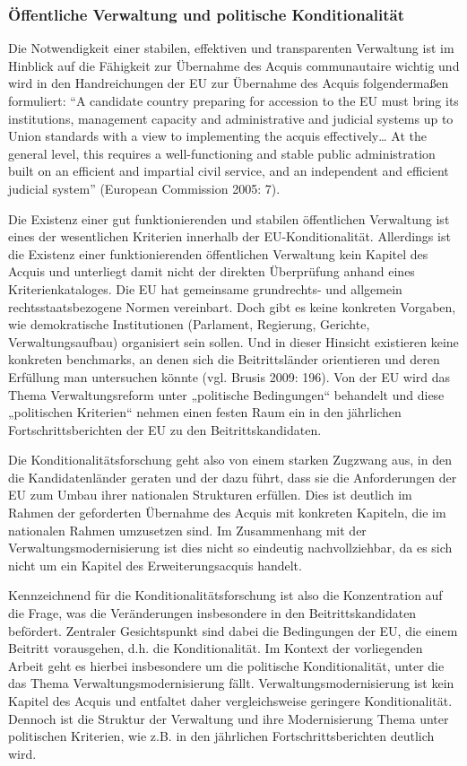 \subsubsection{Öffentliche Verwaltung und politische Konditionalität}

Die Notwendigkeit einer stabilen, effektiven und transparenten Verwaltung ist im Hinblick auf die Fähigkeit zur Übernahme des Acquis communautaire wichtig und wird in den Handreichungen der EU zur Übernahme des Acquis folgendermaßen formuliert: “A candidate country preparing for accession to the EU must bring its institutions, management capacity and administrative and judicial systems up to Union standards with a view to implementing the acquis effectively… At the general level, this requires a well-functioning and stable public administration built on an efficient and impartial civil service, and an independent and efficient judicial system” (European Commission 2005: 7).\par
Die Existenz einer gut funktionierenden und stabilen öffentlichen Verwaltung ist eines der wesentlichen Kriterien innerhalb der EU-Konditionalität. Allerdings ist die Existenz einer funktionierenden öffentlichen Verwaltung kein Kapitel des Acquis und unterliegt damit nicht der direkten Überprüfung anhand eines Kriterienkataloges. Die EU hat gemeinsame grundrechts- und allgemein rechtsstaatsbezogene Normen vereinbart. Doch gibt es keine konkreten Vorgaben, wie demokratische Institutionen (Parlament, Regierung, Gerichte, Verwaltungsaufbau) organisiert sein sollen. Und in dieser Hinsicht existieren keine konkreten benchmarks, an denen sich die Beitrittsländer orientieren und deren Erfüllung man untersuchen könnte (vgl. Brusis 2009: 196). Von der EU wird das Thema Verwaltungsreform unter „politische Bedingungen“ behandelt und diese „politischen Kriterien“ nehmen einen festen Raum ein in den jährlichen Fortschrittsberichten der EU zu den Beitrittskandidaten.\par
Die Konditionalitätsforschung geht also von einem starken Zugzwang aus, in den die Kandidatenländer geraten und der dazu führt, dass sie die Anforderungen der EU zum Umbau ihrer nationalen Strukturen erfüllen. Dies ist deutlich im Rahmen der geforderten Übernahme des Acquis mit konkreten Kapiteln, die im nationalen Rahmen umzusetzen sind. Im Zusammenhang mit der Verwaltungsmodernisierung ist dies nicht so eindeutig nachvollziehbar, da es sich nicht um ein Kapitel des Erweiterungsacquis handelt.\par
Kennzeichnend für die Konditionalitätsforschung ist also die Konzentration auf die Frage, was die Veränderungen insbesondere in den Beitrittskandidaten befördert. Zentraler Gesichtspunkt sind dabei die Bedingungen der EU, die einem Beitritt vorausgehen, d.h. die Konditionalität. Im Kontext der vorliegenden Arbeit geht es hierbei insbesondere um die politische Konditionalität, unter die das Thema Verwaltungsmodernisierung fällt. Verwaltungsmodernisierung ist kein Kapitel des Acquis und entfaltet daher vergleichsweise geringere Konditionalität. Dennoch ist die Struktur der Verwaltung und ihre Modernisierung Thema unter politischen Kriterien, wie z.B. in den jährlichen Fortschrittsberichten deutlich wird.\par
